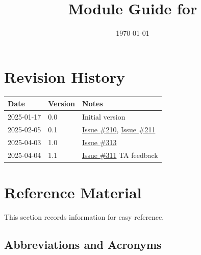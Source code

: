 \documentclass[12pt, titlepage]{article}
\begin{document}
\title{Module Guide for \progname{}} 
\author{\authname}
\date{\today}

\maketitle


\section{Revision History}

\begin{tabularx}{\textwidth}{p{3cm}p{2cm}X}
\toprule {\bf Date} & {\bf Version} & {\bf Notes}\\
\midrule
2025-01-17 & 0.0 & Initial version\\
2025-02-05 & 0.1 & \href{https://github.com/emilyperica/ScoreGen/issues/210}{Issue \#210}, \href{https://github.com/emilyperica/ScoreGen/issues/211}{Issue \#211}\\
2025-04-03 & 1.0 & \href{https://github.com/emilyperica/ScoreGen/issues/313}{Issue \#313}\\
2025-04-04 & 1.1 & \href{https://github.com/emilyperica/ScoreGen/issues/311}{Issue \#311} TA feedback\\
\bottomrule
\end{tabularx}

\newpage

\section{Reference Material}

This section records information for easy reference.

\subsection{Abbreviations and Acronyms}
\end{document}
